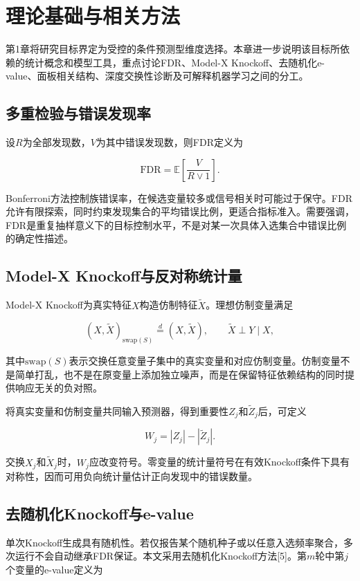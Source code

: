 \documentclass{sufethesismas}
\begin{document}
\chapter{理论基础与相关方法}

第1章将研究目标界定为受控的条件预测型维度选择。本章进一步说明该目标所依赖的统计概念和模型工具，重点讨论FDR、Model-X Knockoff、去随机化e-value、面板相关结构、深度交换性诊断及可解释机器学习之间的分工。

\section{多重检验与错误发现率}

设\(R\)为全部发现数，\(V\)为其中错误发现数，则FDR定义为

\[
\mathrm{FDR}=\mathbb{E}\left[\frac{V}{R\vee1}\right].
\]

Bonferroni方法控制族错误率，在候选变量较多或信号相关时可能过于保守。FDR允许有限探索，同时约束发现集合的平均错误比例，更适合指标准入。需要强调，FDR是重复抽样意义下的目标控制水平，不是对某一次具体入选集合中错误比例的确定性描述。

\section{Model-X Knockoff与反对称统计量}

Model-X Knockoff为真实特征\(X\)构造仿制特征\(\widetilde X\)。理想仿制变量满足

\[
(X,\widetilde X)_{\mathrm{swap}(S)}
\overset{d}{=}(X,\widetilde X),\qquad
\widetilde X\perp Y\mid X,
\]

其中\(\mathrm{swap}(S)\)表示交换任意变量子集中的真实变量和对应仿制变量。仿制变量不是简单打乱，也不是在原变量上添加独立噪声，而是在保留特征依赖结构的同时提供响应无关的负对照。

将真实变量和仿制变量共同输入预测器，得到重要性\(Z_j\)和\(\widetilde Z_j\)后，可定义

\[
W_j=|Z_j|-|\widetilde Z_j|.
\]

交换\(X_j\)和\(\widetilde X_j\)时，\(W_j\)应改变符号。零变量的统计量符号在有效Knockoff条件下具有对称性，因而可用负向统计量估计正向发现中的错误数量。

\section{去随机化Knockoff与e-value}

单次Knockoff生成具有随机性。若仅报告某个随机种子或以任意入选频率聚合，多次运行不会自动继承FDR保证。本文采用去随机化Knockoff方法{[}5{]}。第\(m\)轮中第\(j\)个变量的e-value定义为
\end{document}
